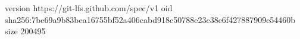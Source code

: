 version https://git-lfs.github.com/spec/v1
oid sha256:7be69a9b83bea16755bf52a406cabd918c50788e23c38e6f427887909e54460b
size 200495
